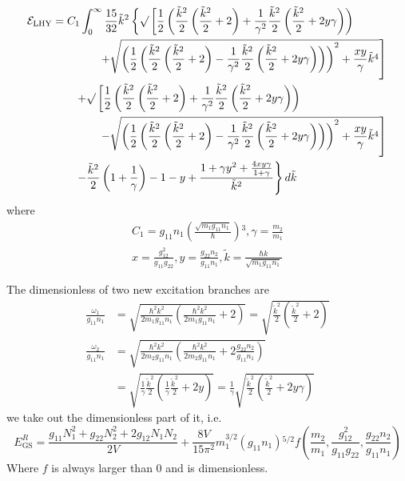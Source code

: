 \begin{equation}
\begin{split}
\mathcal{E}_{\text{LHY}}&=C_1\int_0^{\infty}\frac{15}{32}\tilde{k}^2\left\{\surd\left[\frac{1}{2}\left(\frac{\tilde{k}^2}{2}\left(\frac{\tilde{k}^2}{2}+2\right)+\frac{1}{\gamma^2}\frac{\tilde{k}^2}{2}\left(\frac{\tilde{k}^2}{2}+2y \gamma\right)\right)\right.\right.\\
&\qquad\qquad\left.\left.+\sqrt{\left(\frac{1}{2}\left(\frac{\tilde{k}^2}{2}\left(\frac{\tilde{k}^2}{2}+2\right)-\frac{1}{\gamma^2}\frac{\tilde{k}^2}{2}\left(\frac{\tilde{k}^2}{2}+2y\gamma\right)\right)\right)^2+\frac{x y}{\gamma}\tilde{k}^4}\right]\right.\\
&\qquad\left.+\surd\left[\frac{1}{2}\left(\frac{\tilde{k}^2}{2}\left(\frac{\tilde{k}^2}{2}+2\right)+\frac{1}{\gamma^2}\frac{\tilde{k}^2}{2}\left(\frac{\tilde{k}^2}{2}+2y\gamma\right)\right)\right.\right.\\
&\qquad\qquad\left.\left.-\sqrt{\left(\frac{1}{2}\left(\frac{\tilde{k}^2}{2}\left(\frac{\tilde{k}^2}{2}+2\right)-\frac{1}{\gamma^2}\frac{\tilde{k}^2}{2}\left(\frac{\tilde{k}^2}{2}+2y\gamma\right)\right)\right)^2+\frac{xy}{\gamma}\tilde{k}^4}\right]\right.\\
&\qquad\left.-\frac{\tilde{k}^2}{2}\left(1+\frac{1}{\gamma}\right)-1-y+\frac{1+\gamma y^2+\frac{4xy\gamma}{1+\gamma}}{\tilde{k}^2}\right\}d\tilde{k}
\end{split}
\end{equation}
where
\begin{equation}
\begin{split}
C_1=g_{11}n_1\left(\frac{\sqrt{m_1g_{11}n_1}}{\hbar }\right){}^3, \gamma =\frac{m_2}{m_1}\\
x=\frac{g_{12}^2}{g_{11}g_{22}}, y=\frac{g_{22}n_2}{g_{11}n_1}, \tilde{k}=\frac{\hbar  k}{\sqrt{m_1g_{11}n_1}}
\end{split}
\end{equation}

The dimensionless of two new excitation branches are
\begin{equation}
\begin{split}
\frac{\omega _1}{g_{11}n_1}&=\sqrt{\frac{\hbar^2k^2}{2m_1g_{11}n_1}\left(\frac{\hbar^2k^2}{2m_1g_{11}n_1}+2\right)}=\sqrt{\frac{\tilde{k}^2}{2}\left(\frac{\tilde{k}^2}{2}+2\right)}\\
\frac{\omega _2}{g_{11}n_1}&=\sqrt{\frac{\hbar^2k^2}{2m_2g_{11}n_1}\left(\frac{\hbar^2k^2}{2m_2g_{11}n_1}+2\frac{g_{22}n_2}{g_{11}n_1}\right)}\\
&=\sqrt{\frac{1}{\gamma}\frac{\tilde{k}^2}{2}\left(\frac{1}{\gamma}\frac{\tilde{k}^2}{2}+2y\right)}=\frac{1}{\gamma}\sqrt{\frac{\tilde{k}^2}{2}\left(\frac{\tilde{k}^2}{2}+2y\gamma \right)}
\end{split}
\end{equation}
we take out the dimensionless part of it, i.e.
\begin{equation}
E_{\text{GS}}^R=\frac{g_{11}N_1^2+g_{22}N_2^2+2g_{12}N_1N_2}{2V}+\frac{8V}{15\pi^2}m_1^{3/2}\left(g_{11}n_1\right){}^{5/2}f\left(\frac{m_2}{m_1},\frac{g_{12}^2}{g_{11}g_{22}},\frac{g_{22}n_2}{g_{11}n_1}\right)
\end{equation}
Where $f$ is always larger than 0 and is dimensionless.

